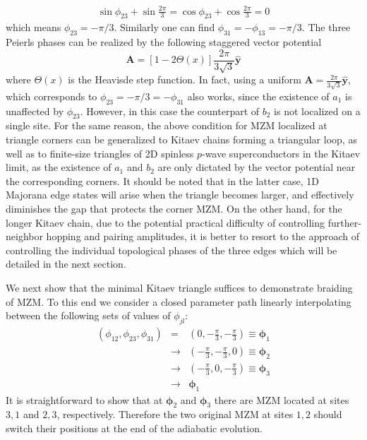 \documentclass[aps,prb,showpacs,amsmath,twocolumn,amssymb,superscriptaddress]{revtex4-2}
\let\oldhat\hat
\renewcommand{\hat}[1]{\oldhat{\mathbf{#1}}}
\renewcommand{\vec}[1]{\mathbf{#1}}
\begin{document}
\begin{eqnarray}
    \sin\phi_{23} + \sin\frac{2\pi}{3} =\cos\phi_{23} + \cos\frac{2\pi}{3} = 0
\end{eqnarray}
which means $\phi_{23} = -\pi/3$. Similarly one can find $\phi_{31} =-\phi_{13} = -\pi/3$. The three Peierls phases can be realized by the following staggered vector potential
\begin{equation}\label{eq:Astep}
  \vec{A} =\left[1-2\Theta(x)\right]\frac{2 \pi}{3\sqrt{3}} \hat{y}
\end{equation}
where $\Theta(x)$ is the Heavisde step function. In fact, using a uniform $\vec{A} =\frac{2 \pi}{3\sqrt{3}} \hat{y}$, which corresponds to $\phi_{23} = -\pi/3 = -\phi_{31}$ also works, since the existence of $a_1$ is unaffected by $\phi_{23}$. However, in this case the counterpart of $b_2$ is not localized on a single site. For the same reason, the above condition for MZM localized at triangle corners can be generalized to Kitaev chains forming a triangular loop, as well as to finite-size triangles of 2D spinless $p$-wave superconductors in the Kitaev limit, as the existence of $a_1$ and $b_2$ are only dictated by the vector potential near the corresponding corners. It should be noted that in the latter case, 1D Majorana edge states will arise when the triangle becomes larger, and effectively diminishes the gap that protects the corner MZM.  On the other hand, for the longer Kitaev chain, due to the potential practical difficulty of controlling further-neighbor hopping and pairing amplitudes, it is better to resort to the approach of controlling the individual topological phases of the three edges which will be detailed in the next section.

We next show that the minimal Kitaev triangle suffices to demonstrate braiding of MZM. To this end we consider a closed parameter path linearly interpolating between the following sets of values of $\phi_{jl}$:
\begin{eqnarray}
    (\phi_{12},\phi_{23},\phi_{31}) &=& \left(0,-\frac{\pi}{3},-\frac{\pi}{3}\right ) \equiv \bm \phi_1 \\\nonumber
    &\rightarrow& \left(-\frac{\pi}{3},-\frac{\pi}{3},0 \right) \equiv \bm \phi_2 \\\nonumber
    &\rightarrow& \left(-\frac{\pi}{3},0,-\frac{\pi}{3} \right) \equiv \bm \phi_3 \\\nonumber
    &\rightarrow& \bm \phi_1
\end{eqnarray}
It is straightforward to show that at $\bm \phi_{2}$ and $\bm \phi_3$ there are MZM located at sites $3,1$ and $2,3$, respectively. Therefore the two original MZM at sites $1,2$ should switch their positions at the end of the adiabatic evolution.
\end{document}
